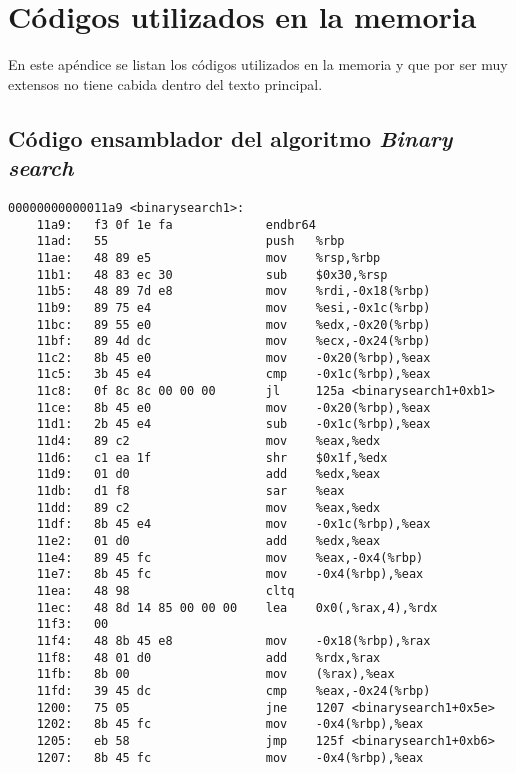 \chapter{Códigos utilizados en la memoria}
\label{apen:codigos}

En este apéndice se listan los códigos utilizados en la memoria y que por ser
muy extensos no tiene cabida dentro del texto principal.

\section{Código ensamblador del algoritmo \textit{Binary search}}
\label{apensec:binarySearch}

\begin{mycode}
    \begin{verbatim}
00000000000011a9 <binarysearch1>:
    11a9:	f3 0f 1e fa          	endbr64
    11ad:	55                   	push   %rbp
    11ae:	48 89 e5             	mov    %rsp,%rbp
    11b1:	48 83 ec 30          	sub    $0x30,%rsp
    11b5:	48 89 7d e8          	mov    %rdi,-0x18(%rbp)
    11b9:	89 75 e4             	mov    %esi,-0x1c(%rbp)
    11bc:	89 55 e0             	mov    %edx,-0x20(%rbp)
    11bf:	89 4d dc             	mov    %ecx,-0x24(%rbp)
    11c2:	8b 45 e0             	mov    -0x20(%rbp),%eax
    11c5:	3b 45 e4             	cmp    -0x1c(%rbp),%eax
    11c8:	0f 8c 8c 00 00 00    	jl     125a <binarysearch1+0xb1>
    11ce:	8b 45 e0             	mov    -0x20(%rbp),%eax
    11d1:	2b 45 e4             	sub    -0x1c(%rbp),%eax
    11d4:	89 c2                	mov    %eax,%edx
    11d6:	c1 ea 1f             	shr    $0x1f,%edx
    11d9:	01 d0                	add    %edx,%eax
    11db:	d1 f8                	sar    %eax
    11dd:	89 c2                	mov    %eax,%edx
    11df:	8b 45 e4             	mov    -0x1c(%rbp),%eax
    11e2:	01 d0                	add    %edx,%eax
    11e4:	89 45 fc             	mov    %eax,-0x4(%rbp)
    11e7:	8b 45 fc             	mov    -0x4(%rbp),%eax
    11ea:	48 98                	cltq
    11ec:	48 8d 14 85 00 00 00 	lea    0x0(,%rax,4),%rdx
    11f3:	00 
    11f4:	48 8b 45 e8          	mov    -0x18(%rbp),%rax
    11f8:	48 01 d0             	add    %rdx,%rax
    11fb:	8b 00                	mov    (%rax),%eax
    11fd:	39 45 dc             	cmp    %eax,-0x24(%rbp)
    1200:	75 05                	jne    1207 <binarysearch1+0x5e>
    1202:	8b 45 fc             	mov    -0x4(%rbp),%eax
    1205:	eb 58                	jmp    125f <binarysearch1+0xb6>
    1207:	8b 45 fc             	mov    -0x4(%rbp),%eax

\end{verbatim}
\end{mycode}
